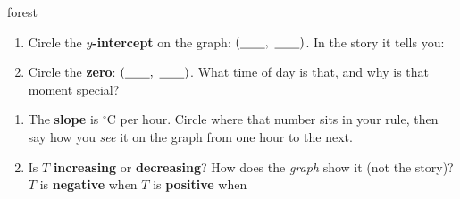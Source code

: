 \documentclass[10pt]{article}
\newcommand{\tempgrid}{%
  \draw[step=1, linegray!40, very thin] (0,-8) grid (7,8);
  \draw[->, semithick, charcoal] (0,0)--(7.6,0) node[right, font=\scriptsize]{$h$};
  \draw[->, semithick, charcoal] (0,-8.6)--(0,8.8) node[above, font=\scriptsize]{$T$ ($^\circ$C)};
  \foreach \x in {1,...,7} \node[charcoal, font=\tiny, below] at (\x,0){\x};
  \foreach \y in {-8,-6,-4,-2,2,4,6,8} \node[charcoal, font=\tiny, left] at (0,\y){\y};}
\begin{document}
\begin{scenariobox}{forest}
\begin{minipage}[t]{0.58\linewidth}
\vspace{0pt}
\begin{enumerate}[label=\textbf{\alph*.}, start=3, leftmargin=1.8em, itemsep=5pt]
  \item Circle the \textbf{$y$-intercept} on the graph: $(\blank{0.7cm},\ \blank{0.7cm})$.
        In the story it tells you:
  \item Circle the \textbf{zero}: $(\blank{0.7cm},\ \blank{0.7cm})$. What time of day is that,
        and why is that moment special?
\end{enumerate}
\end{minipage}\hfill
\begin{minipage}[t]{0.38\linewidth}
\vspace{0pt}\centering
{}
\end{minipage}

\begin{enumerate}[label=\textbf{\alph*.}, start=5, leftmargin=1.8em, itemsep=5pt]
  \item The \textbf{slope} is \blank{1.2cm} $^\circ$C per hour. Circle where that number sits in
        your rule, then say how you \emph{see} it on the graph from one hour to the next.
  \item Is $T$ \textbf{increasing} or \textbf{decreasing}? \blank{2.4cm} \;
        How does the \emph{graph} show it (not the story)? \blank{4.0cm} \\[3pt]
        $T$ is \textbf{negative} when \blank{2.4cm} \qquad
        $T$ is \textbf{positive} when \blank{2.4cm}
\end{enumerate}
\end{scenariobox}
\end{document}
